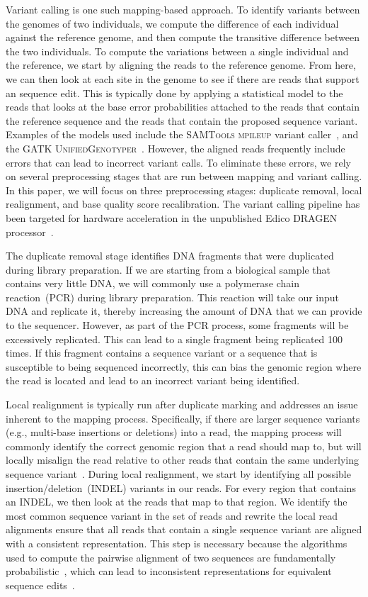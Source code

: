 \documentclass[phd]{ucbthesis}
\begin{document}
Variant calling is one such mapping-based approach. To identify variants between
the genomes of two individuals, we compute the difference of each individual
against the reference genome, and then compute the transitive difference between
the two individuals. To compute the variations between a single individual and
the reference, we start by aligning the reads to the reference genome. From
here, we can then look at each site in the genome to see if there are reads that
support an sequence edit. This is typically done by applying a statistical model
to the reads that looks at the base error probabilities attached to the reads
that contain the reference sequence and the reads that contain the proposed
sequence variant. Examples of the models used include the \textsc{SAMTools
mpileup} variant caller~\cite{li11}, and the \textsc{GATK
UnifiedGenotyper}~\cite{depristo11}. However, the aligned reads frequently
include errors that can lead to incorrect variant calls. To eliminate these
errors, we rely on several preprocessing stages that are run between mapping and
variant calling. In this paper, we will focus on three preprocessing stages:
duplicate removal, local realignment, and base quality score recalibration.
The variant calling pipeline has been targeted for hardware acceleration in the
unpublished Edico \textsc{DRAGEN} processor~\cite{dragen}.

The duplicate removal stage identifies DNA fragments that were duplicated during
library preparation. If we are starting from a biological sample that contains
very little DNA, we will commonly use a polymerase chain reaction~(PCR) during
library preparation. This reaction will take our input DNA and replicate it,
thereby increasing the amount of DNA that we can provide to the sequencer.
However, as part of the PCR process, some fragments will be excessively
replicated. This can lead to a single fragment being replicated 100 times. If
this fragment contains a sequence variant or a sequence that is susceptible to
being sequenced incorrectly, this can bias the genomic region where the read is
located and lead to an incorrect variant being identified.

Local realignment is typically run after duplicate marking and addresses an
issue inherent to the mapping process. Specifically, if there are larger
sequence variants (e.g., multi-base insertions or deletions) into a read, the
mapping process will commonly identify the correct genomic region that a read
should map to, but will locally misalign the read relative to other reads that
contain the same underlying sequence variant~\cite{depristo11}. During local
realignment, we start by identifying all possible insertion/deletion~(INDEL)
variants in our reads. For every region that contains an INDEL, we then look
at the reads that map to that region. We identify the most common sequence
variant in the set of reads and rewrite the local read alignments ensure that
all reads that contain a single sequence variant are aligned with a consistent
representation. This step is necessary because the algorithms used to compute
the pairwise alignment of two sequences are fundamentally
probabilistic~\cite{durbin98, smith81, ukkonen85}, which can lead to
inconsistent representations for equivalent sequence edits~\cite{li14}.
\end{document}
